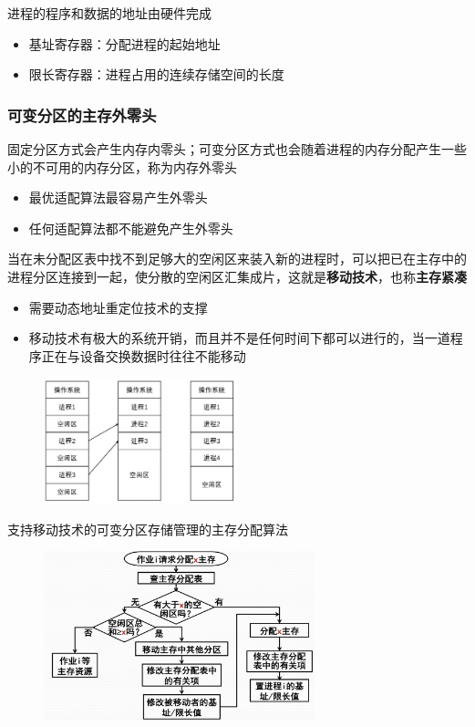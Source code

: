 \documentclass[cs4size,a4paper,10pt]{ctexart}
\begin{document}
		进程的程序和数据的地址由硬件完成
		\begin{itemize}
			\item 基址寄存器：分配进程的起始地址
			\item 限长寄存器：进程占用的连续存储空间的长度
		\end{itemize}

		\subsubsection{可变分区的主存外零头}
		固定分区方式会产生内存内零头；可变分区方式也会随着进程的内存分配产生一些小的不可用的内存分区，称为内存外零头
		\begin{itemize}
			\item 最优适配算法最容易产生外零头
			\item 任何适配算法都不能避免产生外零头
		\end{itemize}
		当在未分配区表中找不到足够大的空闲区来装入新的进程时，可以把已在主存中的进程分区连接到一起，使分散的空闲区汇集成片，这就是\textbf{移动技术}，也称\textbf{主存紧凑}
		\begin{itemize}
			\item 需要动态地址重定位技术的支撑
			\item 移动技术有极大的系统开销，而且并不是任何时间下都可以进行的，当一道程序正在与设备交换数据时往往不能移动
		\end{itemize}
		\begin{figure}[H]
			\centering
			\includegraphics[width=0.5\textwidth]{img/3.2.3.3.1}
		\end{figure}

		支持移动技术的可变分区存储管理的主存分配算法
		\begin{figure}[H]
			\centering
			\includegraphics[width=0.7\textwidth]{img/3.2.3.3.2}
		\end{figure}
\end{document}
